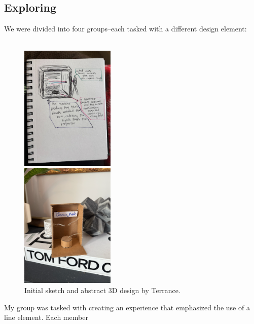 \documentclass{article}
\begin{document}
\subsection{Exploring}
We were divided into four groups–each tasked with a different design element: 
\\\\
\begin{figure}
  \begin{center}
    \begin{subfigure}
    \begin{center}
        \includegraphics[width=0.4\textwidth]{3}
    \end{center}
    \end{subfigure}
  \begin{subfigure}
  \begin{center}
    \includegraphics[width=0.4\textwidth]{4}
  \end{center}
  \end{subfigure}
  \end{center}
  \caption{Initial sketch and abstract 3D design by Terrance.}
\end{figure}
My group was tasked with creating an experience that emphasized the use of a line element. Each member 
\end{document}
